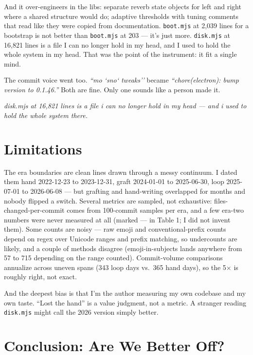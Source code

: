 \documentclass[10pt,letterpaper,twocolumn]{article}
\newcommand{\pull}[1]{%
  \par\vspace{0.4em}
  {\aclight\small\color{acpink}\itshape #1}\par
  \vspace{0.4em}}
\begin{document}
And it over-engineers in the libs: separate reverb state objects for left and right where a shared structure would do; adaptive thresholds with tuning comments that read like they were copied from documentation. \texttt{boot.mjs} at 2,039 lines for a bootstrap is not better than \texttt{boot.mjs} at 203 --- it's just more. \texttt{disk.mjs} at 16,821 lines is a file I can no longer hold in my head, and I used to hold the whole system in my head. That was the point of the instrument: it fit a single mind.

The commit voice went too. \emph{``mo `sno` tweaks''} became \emph{``chore(electron): bump version to 0.1.46.''} Both are fine. Only one sounds like a person made it.

\pull{disk.mjs at 16,821 lines is a file i can no longer hold in my head --- and i used to hold the whole system there.}


\section{Limitations}

The era boundaries are clean lines drawn through a messy continuum. I dated them hand 2022-12-23 to 2023-12-31, graft 2024-01-01 to 2025-06-30, loop 2025-07-01 to 2026-06-08 --- but grafting and hand-writing overlapped for months and nobody flipped a switch. Several metrics are sampled, not exhaustive: files-changed-per-commit comes from 100-commit samples per era, and a few era-two numbers were never measured at all (marked --- in Table 1; I did not invent them). Some counts are noisy --- raw emoji and conventional-prefix counts depend on regex over Unicode ranges and prefix matching, so undercounts are likely, and a couple of methods disagree (emoji-in-subjects lands anywhere from 57 to 715 depending on the range counted). Commit-volume comparisons annualize across uneven spans (343 loop days vs.\ 365 hand days), so the 5$\times$ is roughly right, not exact.

And the deepest bias is that I'm the author measuring my own codebase and my own taste. ``Lost the hand'' is a value judgment, not a metric. A stranger reading \texttt{disk.mjs} might call the 2026 version simply better.


\section{Conclusion: Are We Better Off?}
\end{document}
